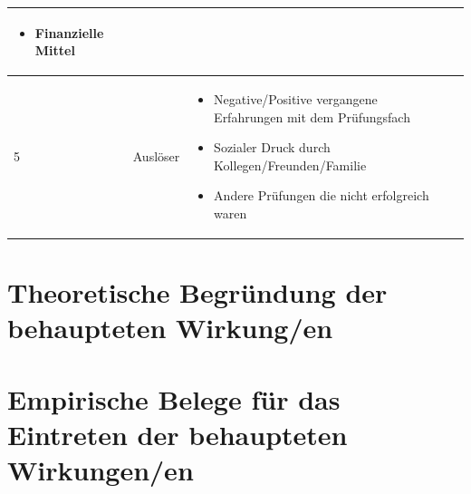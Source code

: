 \documentclass[12pt, a4paper]{article}
\begin{document}
\begin{table}[h!]
\begin{tabularx}{\textwidth}{|p{0.3cm}|p{3.5cm}|X|p{0.3cm}|}
\begin{itemize}[noitemsep, topsep=0pt]
			\item Finanzielle Mittel
		\end{itemize}
		&  \\
		\hline
		5 & Auslöser                               & 
		\begin{itemize}[noitemsep, topsep=0pt]
			\item Negative/Positive vergangene Erfahrungen mit dem Prüfungsfach
			\item Sozialer Druck durch Kollegen/Freunden/Familie
			\item Andere Prüfungen die nicht erfolgreich waren
		\end{itemize}
		&  \\
		\hline
	\end{tabularx}
\end{table}
\newpage
\section*{Theoretische Begründung der behaupteten Wirkung/en}
	\lipsum[2-4]

\newpage
\section*{Empirische Belege für das Eintreten der behaupteten Wirkungen/en}
	\lipsum[3-5]
{}

\end{document}
